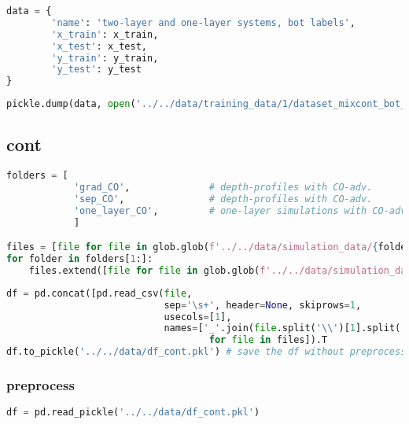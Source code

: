 \begin{lstlisting}[language=Python]
data = {
        'name': 'two-layer and one-layer systems, bot labels',
        'x_train': x_train,
        'x_test': x_test,
        'y_train': y_train,
        'y_test': y_test
}
\end{lstlisting}

\begin{lstlisting}[language=Python]
pickle.dump(data, open('../../data/training_data/1/dataset_mixcont_bot_layer.pkl', 'wb'))
\end{lstlisting}

\hypertarget{cont}{%
\subsection{cont}\label{cont}}

\begin{lstlisting}[language=Python]
folders = [
            'grad_CO',              # depth-profiles with CO-adv.       with gradient layers
            'sep_CO',               # depth-profiles with CO-adv.       with separated layers
            'one_layer_CO',         # one-layer simulations with CO-adv.
            ]

files = [file for file in glob.glob(f'../../data/simulation_data/{folders[0]}/*.spc')]
for folder in folders[1:]:
    files.extend([file for file in glob.glob(f'../../data/simulation_data/{folder}/*.spc')])
\end{lstlisting}

\begin{lstlisting}[language=Python]
df = pd.concat([pd.read_csv(file,
                            sep='\s+', header=None, skiprows=1,
                            usecols=[1],
                            names=['_'.join(file.split('\\')[1].split('_')[:-1])]).T 
                                    for file in files]).T
df.to_pickle('../../data/df_cont.pkl') # save the df without preprocessing
\end{lstlisting}

\hypertarget{preprocess-1}{%
\subsubsection{preprocess}\label{preprocess-1}}

\begin{lstlisting}[language=Python]
df = pd.read_pickle('../../data/df_cont.pkl') 
\end{lstlisting}

